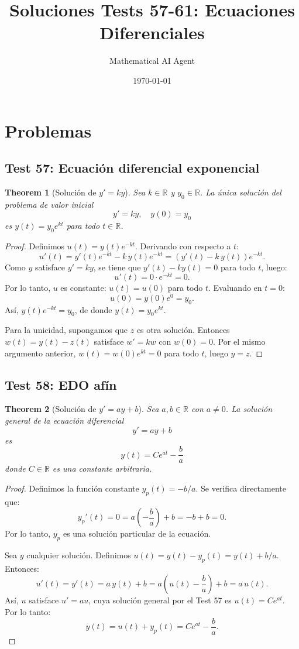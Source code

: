 \documentclass[11pt,a4paper]{article}
\title{Soluciones Tests 57-61: Ecuaciones Diferenciales}
\author{Mathematical AI Agent}
\date{\today}
\theoremstyle{plain}
\newtheorem{theorem}{Theorem}[section]
\theoremstyle{definition}
\begin{document}
\maketitle
\section{Problemas}

\subsection{Test 57: Ecuación diferencial exponencial}
\begin{theorem}[Solución de $y' = ky$]
Sea $k \in \mathbb{R}$ y $y_0 \in \mathbb{R}$. La única solución del problema de valor inicial
\[
y' = ky, \quad y(0) = y_0
\]
es $y(t) = y_0 e^{kt}$ para todo $t \in \mathbb{R}$.
\end{theorem}

\begin{proof}
Definimos $u(t) = y(t) e^{-kt}$. Derivando con respecto a $t$:
\[
u'(t) = y'(t) e^{-kt} - k\, y(t) e^{-kt} = (y'(t) - k\, y(t)) e^{-kt}.
\]
Como $y$ satisface $y' = ky$, se tiene que $y'(t) - ky(t) = 0$ para todo $t$, luego:
\[
u'(t) = 0 \cdot e^{-kt} = 0.
\]
Por lo tanto, $u$ es constante: $u(t) = u(0)$ para todo $t$. Evaluando en $t=0$:
\[
u(0) = y(0) e^{0} = y_0.
\]
Así, $y(t) e^{-kt} = y_0$, de donde $y(t) = y_0 e^{kt}$.

Para la unicidad, supongamos que $z$ es otra solución. Entonces $w(t) = y(t) - z(t)$ satisface $w' = kw$ con $w(0) = 0$. Por el mismo argumento anterior, $w(t) = w(0) e^{kt} = 0$ para todo $t$, luego $y = z$.
\end{proof}

\subsection{Test 58: EDO afín}
\begin{theorem}[Solución de $y' = ay + b$]
Sea $a, b \in \mathbb{R}$ con $a \neq 0$. La solución general de la ecuación diferencial
\[
y' = ay + b
\]
es
\[
y(t) = C e^{at} - \frac{b}{a}
\]
donde $C \in \mathbb{R}$ es una constante arbitraria.
\end{theorem}

\begin{proof}
Definimos la función constante $y_p(t) = -b/a$. Se verifica directamente que:
\[
y_p'(t) = 0 = a \left(-\frac{b}{a}\right) + b = -b + b = 0.
\]
Por lo tanto, $y_p$ es una solución particular de la ecuación.

Sea $y$ cualquier solución. Definimos $u(t) = y(t) - y_p(t) = y(t) + b/a$. Entonces:
\[
u'(t) = y'(t) = a\, y(t) + b = a\left(u(t) - \frac{b}{a}\right) + b = a\, u(t).
\]
Así, $u$ satisface $u' = au$, cuya solución general por el Test 57 es $u(t) = C e^{at}$. Por lo tanto:
\[
y(t) = u(t) + y_p(t) = C e^{at} - \frac{b}{a}.
\]
\end{proof}
\end{document}
